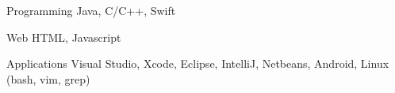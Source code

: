 


\begin{cvskills}


\cvskill
{Programming} %
{Java, C/C++, Swift} %


\cvskill
{Web} %
{HTML, Javascript} %


\cvskill
{Applications} %
{Visual Studio, Xcode, Eclipse, IntelliJ, Netbeans, Android, Linux (bash, vim, grep)} %


\end{cvskills}
